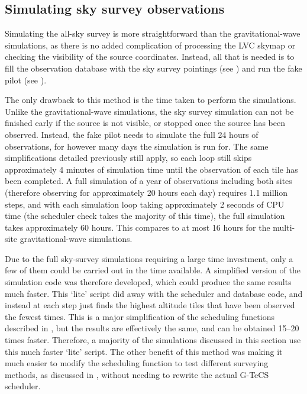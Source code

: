 \subsection{Simulating sky survey observations}
\label{sec:survey_sim_methods}
\begin{colsection}

Simulating the all-sky survey is more straightforward than the gravitational-wave simulations, as there is no added complication of processing the LVC skymap or checking the visibility of the source coordinates. Instead, all that is needed is to fill the observation database with the sky survey pointings (see ) and run the fake pilot (see ).

The only drawback to this method is the time taken to perform the simulations. Unlike the gravitational-wave simulations, the sky survey simulation can not be finished early if the source is not visible, or stopped once the source has been observed. Instead, the fake pilot needs to simulate the full 24 hours of observations, for however many days the simulation is run for. The same simplifications detailed previously still apply, so each loop still skips approximately 4 minutes of simulation time until the observation of each tile has been completed. A full simulation of a year of observations including both sites (therefore observing for approximately 20 hours each day) requires 1.1 million steps, and with each simulation loop taking approximately 2 seconds of CPU time (the scheduler check takes the majority of this time), the full simulation takes approximately 60 hours. This compares to at most 16 hours for the multi-site gravitational-wave simulations.

Due to the full sky-survey simulations requiring a large time investment, only a few of them could be carried out in the time available. A simplified version of the simulation code was therefore developed, which could produce the same results much faster. This `lite' script did away with the scheduler and database code, and instead at each step just finds the highest altitude tiles that have been observed the fewest times. This is a major simplification of the scheduling functions described in , but the results are effectively the same, and can be obtained 15--20 times faster. Therefore, a majority of the simulations discussed in this section use this much faster `lite' script. The other benefit of this method was making it much easier to modify the scheduling function to test different surveying methods, as discussed in , without needing to rewrite the actual G-TeCS scheduler.

\end{colsection}

